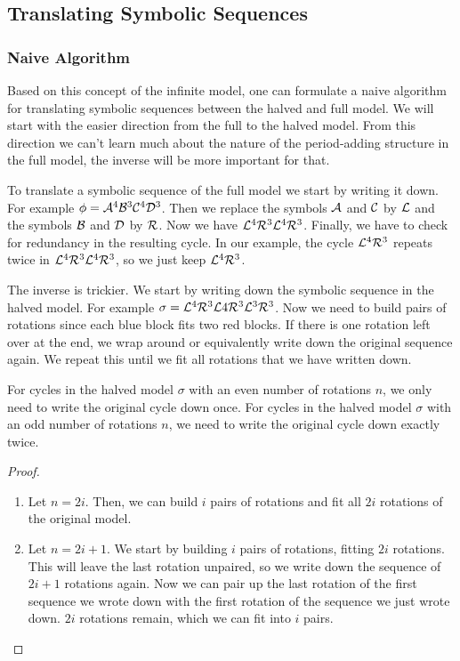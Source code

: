 \subsection{Translating Symbolic Sequences}



\subsubsection{Naive Algorithm}

Based on this concept of the infinite model, one can formulate a naive algorithm for translating symbolic sequences between the halved and full model.
We will start with the easier direction from the full to the halved model.
From this direction we can't learn much about the nature of the period-adding structure in the full model, the inverse will be more important for that.

To translate a symbolic sequence of the full model we start by writing it down.
For example $\phi = \mathcal{A}^4\mathcal{B}^3\mathcal{C}^4\mathcal{D}^3$.
Then we replace the symbols $\mathcal{A}$ and $\mathcal{C}$ by $\mathcal{L}$ and the symbols $\mathcal{B}$ and $\mathcal{D}$ by $\mathcal{R}$.
Now we have $\mathcal{L}^4\mathcal{R}^3\mathcal{L}^4\mathcal{R}^3$.
Finally, we have to check for redundancy in the resulting cycle.
In our example, the cycle $\mathcal{L}^4\mathcal{R}^3$ repeats twice in $\mathcal{L}^4\mathcal{R}^3\mathcal{L}^4\mathcal{R}^3$, so we just keep $\mathcal{L}^4\mathcal{R}^3$.

The inverse is trickier.
We start by writing down the symbolic sequence in the halved model.
For example $\sigma = \mathcal{L}^4\mathcal{R}^3\mathcal{L}4\mathcal{R}^3\mathcal{L}^3\mathcal{R}^3$.
Now we need to build pairs of rotations since each blue block fits two red blocks.
If there is one rotation left over at the end, we wrap around or equivalently write down the original sequence again.
We repeat this until we fit all rotations that we have written down.

\begin{lemma}
    \label{lemma:writing.down}
    For cycles in the halved model $\sigma$ with an even number of rotations $n$, we only need to write the original cycle down once.
    For cycles in the halved model $\sigma$ with an odd number of rotations $n$, we need to write the original cycle down exactly twice.
\end{lemma}

\begin{proof} \phantom{x}
    \begin{enumerate}
        \item Let $n = 2i$. Then, we can build $i$ pairs of rotations and fit all $2i$ rotations of the original model.
        \item Let $n = 2i + 1$. We start by building $i$ pairs of rotations, fitting $2i$ rotations.
              This will leave the last rotation unpaired, so we write down the sequence of $2i + 1$ rotations again.
              Now we can pair up the last rotation of the first sequence we wrote down with the first rotation of the sequence we just wrote down.
              $2i$ rotations remain, which we can fit into $i$ pairs.
    \end{enumerate}
\end{proof}


